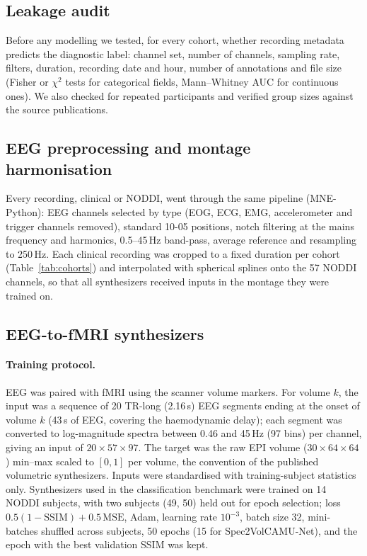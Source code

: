 \documentclass[11pt]{article}
\begin{document}
\subsection{Leakage audit}\label{sec:audit}
Before any modelling we tested, for every cohort, whether recording metadata predicts the diagnostic label: channel set, number of channels, sampling rate, filters, duration, recording date and hour, number of annotations and file size (Fisher or $\chi^2$ tests for categorical fields, Mann--Whitney AUC for continuous ones).
We also checked for repeated participants and verified group sizes against the source publications.

\subsection{EEG preprocessing and montage harmonisation}\label{sec:prep}
Every recording, clinical or NODDI, went through the same pipeline (MNE-Python): EEG channels selected by type (EOG, ECG, EMG, accelerometer and trigger channels removed), standard 10-05 positions, notch filtering at the mains frequency and harmonics, 0.5--45\,Hz band-pass, average reference and resampling to 250\,Hz.
Each clinical recording was cropped to a fixed duration per cohort (Table~\ref{tab:cohorts}) and interpolated with spherical splines onto the 57 NODDI channels, so that all synthesizers received inputs in the montage they were trained on.

\subsection{EEG-to-fMRI synthesizers}\label{sec:synth}
\paragraph{Training protocol.}
EEG was paired with fMRI using the scanner volume markers.
For volume $k$, the input was a sequence of 20 TR-long (2.16\,s) EEG segments ending at the onset of volume $k$ (43\,s of EEG, covering the haemodynamic delay); each segment was converted to log-magnitude spectra between 0.46 and 45\,Hz (97 bins) per channel, giving an input of $20\times57\times97$.
The target was the raw EPI volume ($30\times64\times64$) min--max scaled to $[0,1]$ per volume, the convention of the published volumetric synthesizers.
Inputs were standardised with training-subject statistics only.
Synthesizers used in the classification benchmark were trained on 14 NODDI subjects, with two subjects (49, 50) held out for epoch selection; loss $0.5(1-\mathrm{SSIM}) + 0.5\,\mathrm{MSE}$, Adam, learning rate $10^{-3}$, batch size 32, mini-batches shuffled across subjects, 50 epochs (15 for Spec2VolCAMU-Net), and the epoch with the best validation SSIM was kept.
\end{document}
